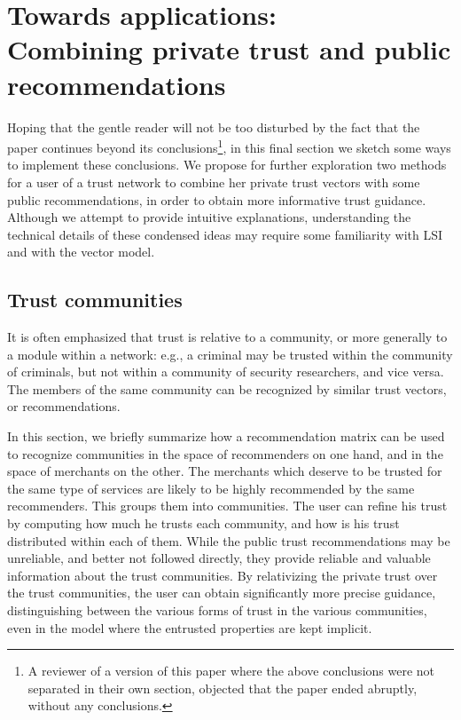 \documentclass{llncs}
\begin{document}
\section{Towards applications:\\
Combining private trust and public recommendations}\label{Combining}
Hoping that the gentle reader will not be too disturbed by the fact that the paper continues beyond its conclusions\footnote{A reviewer of a version of this paper where the above conclusions were not separated in their own section, objected that the paper ended abruptly, without any conclusions.}, in this final section we sketch some ways to implement these conclusions. We propose for further exploration two methods for a user of a trust network to combine her private trust vectors with some public recommendations, in order to obtain more informative trust guidance. Although we attempt to provide intuitive explanations, understanding the technical details of these condensed ideas may require some familiarity with LSI and with the vector model.


\subsection{Trust communities}
It is often emphasized that trust is relative to a community, or more generally to a module \cite{PavlovicD:CSR08} within a network: e.g., a criminal may be trusted within the community of criminals, but not within a community of security researchers, and vice versa. The members of the same community can be recognized by similar trust vectors, or recommendations.

In this section, we briefly summarize how a recommendation matrix can be used to recognize communities in the space of recommenders on one hand, and in the space of merchants on the other. The merchants which deserve to be trusted for the same type of services are likely to be highly recommended by the same recommenders. This groups them into communities. The user  can refine his trust by computing how much he trusts each community, and how is his trust  distributed within each of them. While the public trust recommendations may be unreliable, and better not followed directly, they provide reliable and valuable information about the trust communities. By relativizing the private trust over the trust communities, the user can obtain significantly more precise guidance, distinguishing between the various forms of trust in the various communities, even in the model where the entrusted properties are kept implicit. 
\end{document}
